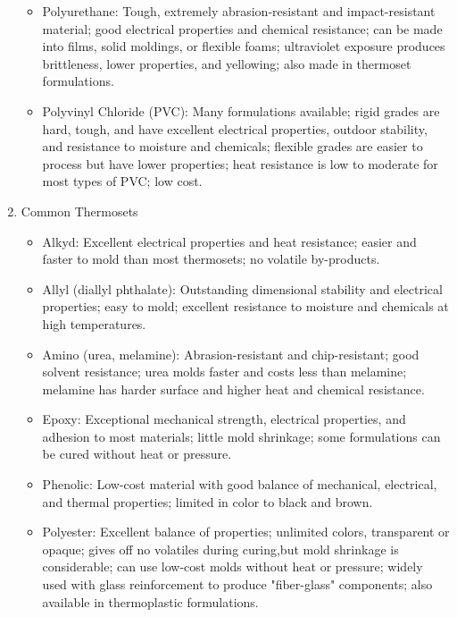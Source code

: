 \documentclass[a4paper,openany,12pt]{book}
\begin{document}
\begin{enumerate}
\begin{itemize}
\item Polyurethane: Tough, extremely abrasion-resistant and impact-resistant
material; good electrical properties and chemical resistance; can be
made into films, solid moldings, or flexible foams; ultraviolet
exposure produces brittleness, lower properties, and yellowing; also
made in thermoset formulations.

\item Polyvinyl Chloride (PVC): Many formulations available; rigid grades
are hard, tough, and have excellent electrical properties, outdoor
stability, and resistance to moisture and chemicals; flexible grades
are easier to process but have lower properties; heat resistance is
low to moderate for most types of PVC; low cost.
\end{itemize}

\item Common Thermosets
\label{common-thermosets}
\begin{itemize}
\item Alkyd: Excellent electrical properties and heat resistance; easier and
faster to mold than most thermosets; no volatile by-products.

\item Allyl (diallyl phthalate): Outstanding dimensional stability and
electrical properties; easy to mold; excellent resistance to moisture
and chemicals at high temperatures.

\item Amino (urea, melamine): Abrasion-resistant and chip-resistant; good
solvent resistance; urea molds faster and costs less than melamine;
melamine has harder surface and higher heat and chemical resistance.

\item Epoxy: Exceptional mechanical strength, electrical properties, and
adhesion to most materials; little mold shrinkage; some formulations
can be cured without heat or pressure.

\item Phenolic: Low-cost material with good balance of mechanical,
electrical, and thermal properties; limited in color to black and
brown.

\item Polyester: Excellent balance of properties; unlimited colors,
transparent or opaque; gives off no volatiles during curing,but mold
shrinkage is considerable; can use low-cost molds without heat or
pressure; widely used with glass reinforcement to produce
"fiber-glass" components; also available in thermoplastic
formulations.


\end{itemize}
\end{enumerate}
\end{document}
